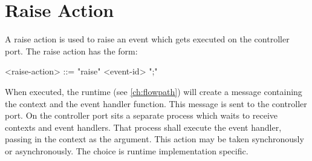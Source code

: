 \section{Raise Action} \label{guide:raise}

A raise action is used to raise an event which gets executed on the controller port. The raise action has the form:

\begin{minip}
\begin{grammar}
<raise-action> ::= "raise" <event-id> ";"
\end{grammar}
\end{minip}

When executed, the runtime (see \ref{ch:flowpath}) will create a message containing the context and the event handler function. This message is sent to the controller port. On the controller port sits a separate process which waits to receive contexts and event handlers. That process shall execute the event handler, passing in the context as the argument. This action may be taken synchronously or asynchronously. The choice is runtime implementation specific.

